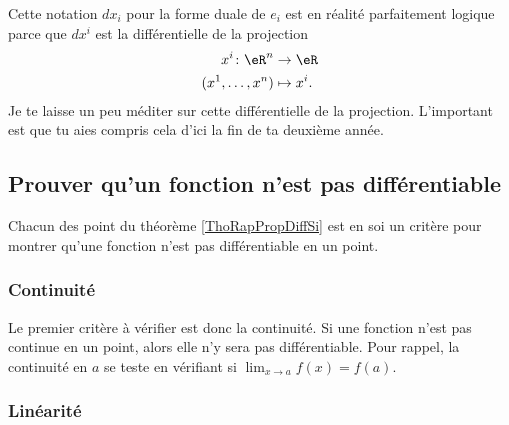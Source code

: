 Cette notation $dx_i$ pour la forme duale de $e_i$ est en réalité parfaitement logique parce que $dx^i$ est la différentielle de la projection
\begin{equation}
    \begin{aligned}
        x^i\colon \eR^n&\to \eR \\
        (x^1,\ldots,x^n)&\mapsto x^i. 
    \end{aligned}
\end{equation}
Je te laisse un peu méditer sur cette différentielle de la projection. L'important est que tu aies compris cela d'ici la fin de ta deuxième année.


                    \subsection{Prouver qu'un fonction n'est pas différentiable}

Chacun des point du théorème \ref{ThoRapPropDiffSi} est en soi un critère pour montrer qu'une fonction n'est pas différentiable en un point.

                    \subsubsection{Continuité}


Le premier critère à vérifier est donc la continuité. Si une fonction n'est pas continue en un point, alors elle n'y sera pas différentiable. Pour rappel, la continuité en $a$ se teste en vérifiant si $\lim_{x\to a}f(x)=f(a)$.

                    \subsubsection{Linéarité}

